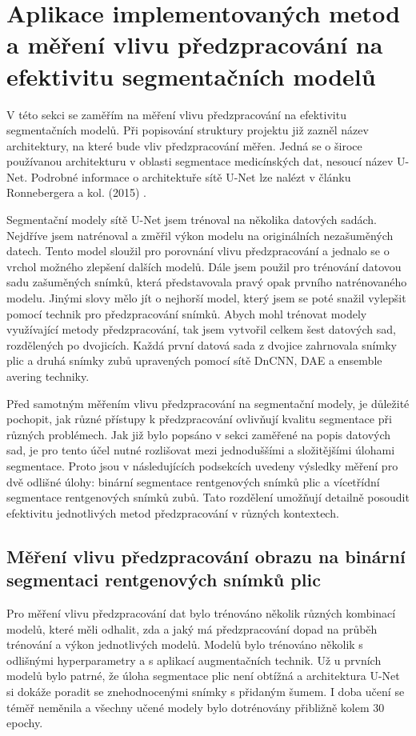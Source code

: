 \documentclass[male,czech,api_ing]{thesis}
\begin{document}
\section{Aplikace implementovaných metod a měření vlivu předzpracování na efektivitu segmentačních modelů}
V této sekci se zaměřím na měření vlivu předzpracování na efektivitu segmentačních modelů. Při popisování struktury projektu již zazněl název architektury, na které bude vliv předzpracování měřen. Jedná se o široce používanou architekturu v oblasti segmentace medicínských dat, nesoucí název U-Net. Podrobné informace o architektuře sítě U-Net lze nalézt v článku Ronnebergera a kol. (2015) \cite{UNET_paper}.

Segmentační modely sítě U-Net jsem trénoval na několika datových sadách. Nejdříve jsem natrénoval a změřil výkon modelu na originálních nezašuměných datech. Tento model sloužil pro porovnání vlivu předzpracování a jednalo se o vrchol možného zlepšení dalších modelů. Dále jsem použil pro trénování datovou sadu zašuměných snímků, která představovala pravý opak prvního natrénovaného modelu. Jinými slovy mělo jít o nejhorší model, který jsem se poté snažil vylepšit pomocí technik pro předzpracování snímků. Abych mohl trénovat modely využívající metody předzpracování, tak jsem vytvořil celkem šest datových sad, rozdělených po dvojicích. Každá první datová sada z dvojice zahrnovala snímky plic a druhá snímky zubů upravených pomocí sítě DnCNN, DAE a ensemble avering techniky.

Před samotným měřením vlivu předzpracování na segmentační modely, je důležité pochopit, jak různé přístupy k předzpracování ovlivňují kvalitu segmentace při různých problémech. Jak již bylo popsáno v sekci zaměřené na popis datových sad, je pro tento účel nutné rozlišovat mezi jednoduššími a složitějšími úlohami segmentace. Proto jsou v následujících podsekcích uvedeny výsledky měření pro dvě odlišné úlohy: binární segmentace rentgenových snímků plic a vícetřídní segmentace rentgenových snímků zubů. Tato rozdělení umožňují detailně posoudit efektivitu jednotlivých metod předzpracování v různých kontextech.

\subsection{Měření vlivu předzpracování obrazu na binární segmentaci rentgenových snímků plic}
Pro měření vlivu předzpracování dat bylo trénováno několik různých kombinací modelů, které měli odhalit, zda a jaký má předzpracování dopad na průběh trénování a výkon jednotlivých modelů. Modelů bylo trénováno několik s odlišnými hyperparametry a s aplikací augmentačních technik. Už u prvních modelů bylo patrné, že úloha segmentace plic není obtížná a architektura U-Net si dokáže poradit se znehodnocenými snímky s přidaným šumem. I doba učení se téměř neměnila a všechny učené modely bylo dotrénovány přibližně kolem 30 epochy. 
\end{document}

